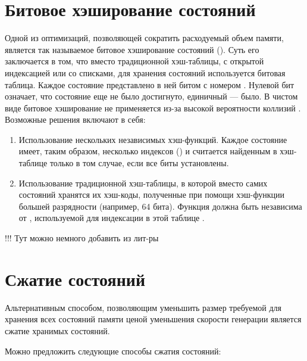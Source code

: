 \section{Битовое хэширование состояний}
\label{sec:bit-hashing}

Одной из оптимизаций, позволяющей сократить расходуемый объем памяти,
является так называемое битовое хэширование состояний (). Суть его заключается в том, что вместо традиционной
хэш-таблицы, с открытой индексацией или со списками, для хранения
состояний используется битовая таблица. Каждое состояние 
представлено в ней битом с номером . Нулевой бит
означает, что состояние еще не было достигнуто, единичный — было. В
чистом виде битовое хэширование не применяется из-за высокой
вероятности коллизий \cite{BitHash1}. Возможные решения включают в
себя:

\begin{enumerate}
\item Использование нескольких независимых хэш-функций. Каждое
  состояние имеет, таким образом, несколько индексов () и считается найденным в
  хэш-таблице только в том случае, если все биты 
  установлены.

\item Использование традиционной хэш-таблицы, в которой вместо самих
  состояний хранятся их хэш-коды, полученные при помощи хэш-функции
   большей разрядности (например, 64 бита). Функция 
  должна быть независима от , используемой для индексации в этой
  таблице \cite{BitHash1}.
\end{enumerate}

!!! Тут можно немного добавить из лит-ры

\section{Сжатие состояний}
\label{sec:state-compression}


Альтернативным способом, позволяющим уменьшить размер требуемой для
хранения всех состояний памяти ценой уменьшения скорости генерации
является сжатие хранимых состояний. 

Можно предложить следующие способы сжатия состояний:

